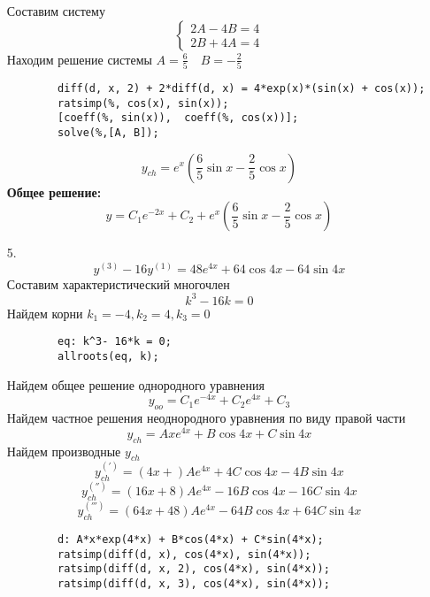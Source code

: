 \documentclass[a4paper, 12pt, oneside]{scrartcl}
\begin{document}
\begin{enumerate}
		Составим систему \\
		\begin{equation*}
		  \begin{cases}
   			2A - 4B = 4 \\
   			2B + 4A = 4 
   			\end{cases}
		\end{equation*}
		Находим решение системы $A = \frac{6}{5} \quad B = -\frac{2}{5}  $ \\
		\begin{verbatim}
		diff(d, x, 2) + 2*diff(d, x) = 4*exp(x)*(sin(x) + cos(x));
		ratsimp(%, cos(x), sin(x));
		[coeff(%, sin(x)),  coeff(%, cos(x))];
		solve(%,[A, B]);
		\end{verbatim} 


		$$ y_{ch} = e^{x}( \frac{6}{5} \sin{x} - \frac{2}{5} \cos{x})   $$
		\textbf{Общее решение: }
		$$ y = C_{1}e^{-2x} + C_{2} + e^{x}( \frac{6}{5} \sin{x} - \frac{2}{5} \cos{x})  $$

		\item[5.]
		$$ y^{(3)} - 16y^{(1)} = 48e^{4x} + 64\cos{4x} - 64\sin{4x} $$
		Составим характеристический многочлен \\
		$$ k^{3} - 16k = 0 $$
		Найдем корни $ k_{1} = -4, k_{2} = 4, k_{3} = 0 $ \\
		\begin{verbatim}
		eq: k^3- 16*k = 0; 
		allroots(eq, k);
		\end{verbatim} 

		Найдем общее решение однородного уравнения \\
		$$ y_{oo} = C_{1}e^{-4x} + C_{2}e^{4x} + C_{3} $$
		Найдем частное решения неоднородного уравнения по виду правой части \\
		$$ y_{ch} = Axe^{4x} + B\cos{4x} + C\sin{4x} $$
		Найдем производные $ y_{ch} $
		$$ y_{ch}^{(')} = (4x + )Ae^{4x} + 4C\cos{4x} - 4B\sin{4x} $$
		$$ y_{ch}^{('')} = (16x + 8)Ae^{4x} - 16B\cos{4x} - 16C\sin{4x} $$
		$$ y_{ch}^{(''')} = (64x + 48)Ae^{4x} - 64B\cos{4x} + 64C\sin{4x} $$
		\begin{verbatim}
		d: A*x*exp(4*x) + B*cos(4*x) + C*sin(4*x);
		ratsimp(diff(d, x), cos(4*x), sin(4*x));
		ratsimp(diff(d, x, 2), cos(4*x), sin(4*x));
		ratsimp(diff(d, x, 3), cos(4*x), sin(4*x));
		\end{verbatim} 


\end{enumerate}
\end{document}
